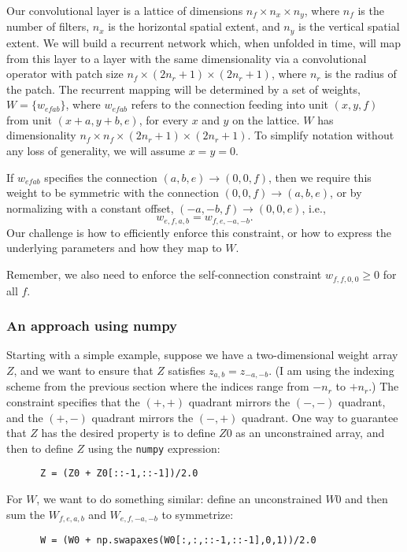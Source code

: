 \documentclass[11pt,letterpaper]{article}
\begin{document}
Our convolutional layer is a lattice of dimensions
$n_f \times n_x \times n_y$, where 
$n_f$ is the number of filters,
$n_x$ is the horizontal spatial extent,  and
$n_y$ is the vertical spatial extent.
We will build a recurrent network which, when unfolded in time, will map from
this layer to a layer with the
same dimensionality via a convolutional operator with patch size
$n_f \times (2n_r+1) \times (2n_r+1)$, where $n_r$ is the radius of the patch.
The recurrent mapping will be determined by a set of weights, 
$W = \{ w_{efab} \}$, where $w_{efab}$ refers to the connection feeding into
unit $(x,y,f)$ from unit $(x+a,y+b,e)$, for every $x$ and $y$ on the lattice.
$W$ has dimensionality $n_f \times n_f \times (2n_r+1) \times (2n_r+1)$.
To simplify notation without any loss of generality, we will assume $x=y=0$.

If $w_{efab}$ specifies the connection $(a,b,e) \to (0,0,f)$, then we require 
this weight to be symmetric with the connection $(0,0,f)\to(a,b,e)$,
or by normalizing with a constant offset, $(-a,-b,f)\to (0,0,e)$, i.e., 
\[
w_{e,f,a,b} = w_{f,e,-a,-b}.
\]
Our challenge is how to efficiently enforce this constraint, or how
to express the underlying parameters and how they map to $W$. 

Remember, we also need to enforce the self-connection constraint $w_{f,f,0,0}\ge0$ for all $f$.

\subsubsection{An approach using numpy}

Starting with a simple example, suppose we have a two-dimensional weight
array $Z$, and we want to ensure that $Z$ satisfies $z_{a,b}=z_{-a,-b}$.
(I am using the indexing scheme from the previous section where the indices
range from $-n_r$ to $+n_r$.) The constraint specifies that the $(+,+)$ quadrant
mirrors the $(-,-)$ quadrant, and the $(+,-)$ quadrant mirrors the
$(-,+)$ quadrant.  One way to guarantee that $Z$ has the desired property is
to define $Z0$ as an unconstrained array, and then to define $Z$ using
the {\tt numpy} expression:
\begin{verbatim}
      Z = (Z0 + Z0[::-1,::-1])/2.0
\end{verbatim}

For $W$, we want to do something similar: define an unconstrained $W0$ and
then sum the $W_{f,e,a,b}$ and $W_{e,f,-a,-b}$ to symmetrize:
\begin{verbatim}
      W = (W0 + np.swapaxes(W0[:,:,::-1,::-1],0,1))/2.0
\end{verbatim}
\end{document}
